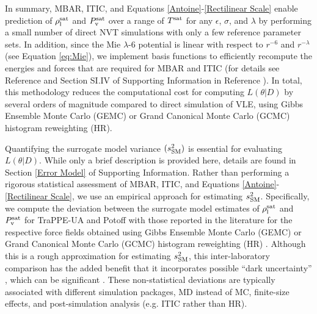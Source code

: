 \documentclass[preprint,letterpaper,floatfix,citeautoscript,aip,jcp]{revtex4-1}
\begin{document}
In summary, MBAR, ITIC, and Equations \ref{Antoine}-\ref{Rectilinear Scale} enable prediction of $\rho_{\rm l}^{\rm sat}$ and $P_{\rm v}^{\rm sat}$ over a range of $T^{\rm sat}$ for any $\epsilon$, $\sigma$, and $\lambda$ by performing a small number of direct NVT simulations with only a few reference parameter sets. In addition, since the Mie $\lambda$-6 potential is linear with respect to $r^{-6}$ and $r^{-\lambda}$ (see Equation \ref{eq:Mie}), we implement basis functions to efficiently recompute the energies and forces that are required for MBAR and ITIC (for details see Reference  and Section SI.IV of Supporting Information in Reference ). 
In total, this methodology reduces the computational cost for computing $L(\theta|D)$ by several orders of magnitude compared to direct simulation of VLE, using Gibbs Ensemble Monte Carlo (GEMC) or Grand Canonical Monte Carlo (GCMC) histogram reweighting (HR).

Quantifying the surrogate model variance $(s^2_{\rm SM})$ 
is essential for evaluating $L(\theta|D)$. While only a brief description is provided here, details are found in Section \ref{Error Model} of Supporting Information. Rather than performing a rigorous statistical assessment of MBAR, ITIC, and Equations \ref{Antoine}-\ref{Rectilinear Scale}, we use an empirical approach for estimating $s^2_{\rm SM}$. Specifically, we compute the deviation between the surrogate model estimates of $\rho_{\rm l}^{\rm sat}$ and $P_{\rm v}^{\rm sat}$ for TraPPE-UA and Potoff 
with those reported in the literature for the respective force fields obtained using Gibbs Ensemble Monte Carlo (GEMC) or Grand Canonical Monte Carlo (GCMC) histogram reweighting (HR) \cite{TraPPE,Mie}. Although this is a rough approximation for estimating $s^2_{\rm SM}$, this inter-laboratory comparison has the added benefit that it incorporates possible ``dark uncertainty'' \cite{GUM}, which can be significant \cite{RoundRobin}. These non-statistical deviations are typically associated with different simulation packages, MD instead of MC, finite-size effects, and post-simulation analysis (e.g. ITIC rather than HR).
\end{document}
